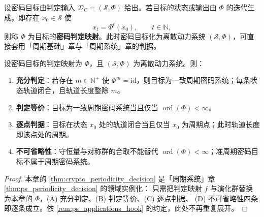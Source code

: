 \begin{definition}[密码判定映射]\label{def:crypto_periodization}
设密码目标由判定输入 \(\mathcal D_{\mathrm{C}}=(\mathcal S,\Phi)\) 给出。若目标的状态或输出由 \(\Phi\) 的迭代生成，即存在 \(x_0\in\mathcal S\) 使
\[
x_t=\Phi^t(x_0),\qquad t\in\mathbb N,
\]
则称 \(\Phi\) 为目标的\textbf{密码判定映射}。此时密码目标化为离散动力系统 \((\mathcal S,\Phi)\)，可直接套用「周期基础」章与「周期系统」章的判据。
\end{definition}

\begin{theorem}[密码周期性判定定理]\label{thm:crypto_periodicity_decision}
设密码目标的判定映射为 \(\Phi\)，且 \((\mathcal S,\Phi)\) 为离散动力系统。则：
\begin{enumerate}[label=(\Alph*)]
    \item \textbf{充分判定}：若存在 \(m\in\mathbb N^+\) 使 \(\Phi^m=\mathrm{id}\)，则目标为一致周期密码系统；每条状态轨道闭合，且轨道长度整除 \(m\)。
    \item \textbf{判定等价}：目标为一致周期密码系统当且仅当 \(\operatorname{ord}(\Phi)<\infty\)。
    \item \textbf{逐点判据}：目标在状态 \(x_0\) 处的轨道闭合当且仅当 \(x_0\) 为周期点；此时轨道长度即该点处的周期。
    \item \textbf{不可省略性}：守恒量与对称群的合取不能替代 \(\operatorname{ord}(\Phi)<\infty\)；准周期密码目标不属于周期密码系统。
\end{enumerate}
\end{theorem}

\begin{proof}
本章的 \cref{thm:crypto_periodicity_decision} 是「周期系统」章 \cref{thm:ps_periodicity_decision} 的领域实例化：
只需把判定映射 $f$ 与演化群替换为本章的 $\Phi$，(A) 充分判定、(B) 判定等价、(C) 逐点判据、
(D) 不可省略性四条即逐条成立。依 \cref{rem:ps_applications_hook} 的约定，此处不再重复展开。
\end{proof}

